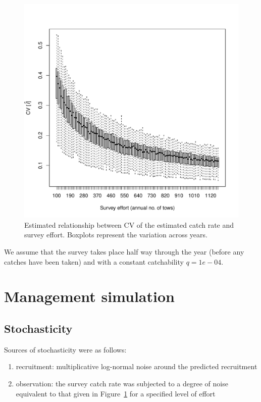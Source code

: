 \documentclass[a4paper]{article}
\begin{document}
\begin{figure}
\centering
\includegraphics{../dat/effCV.pdf}
\caption{Estimated relationship between CV of the estimated catch rate and survey effort. Boxplots represent the variation across years.}
\label{fig:effCV}
\end{figure} 


We assume that the survey takes place half way through the year (before any catches have been taken)
and with a constant catchability $q=1e-04$. 


\section{Management simulation}

\subsection{Stochasticity}


Sources of stochasticity were as follows:
\begin{enumerate}
\item recruitment: multiplicative log-normal noise around the predicted recruitment
\item observation: the survey catch rate was subjected to a degree of noise equivalent to that given in Figure~\ref{fig:effCV}
for a specified level of effort
\end{enumerate}
\end{document}
